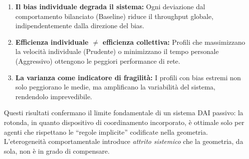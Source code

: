 \begin{enumerate}
    \item \textbf{Il bias individuale degrada il sistema:} Ogni deviazione dal comportamento bilanciato (Baseline) riduce il throughput globale, indipendentemente dalla direzione del bias.
    \item \textbf{Efficienza individuale $\neq$ efficienza collettiva:} Profili che massimizzano la velocità individuale (Prudente) o minimizzano il tempo personale (Aggressivo) ottengono le peggiori performance di rete.
    \item \textbf{La varianza come indicatore di fragilità:} I profili con bias estremi non solo peggiorano le medie, ma amplificano la variabilità del sistema, rendendolo imprevedibile.
\end{enumerate}

Questi risultati confermano il limite fondamentale di un sistema DAI passivo: la rotonda, in quanto dispositivo di coordinamento incorporato, è ottimale solo per agenti che rispettano le ``regole implicite'' codificate nella geometria. L'eterogeneità comportamentale introduce \textit{attrito sistemico} che la geometria, da sola, non è in grado di compensare.
